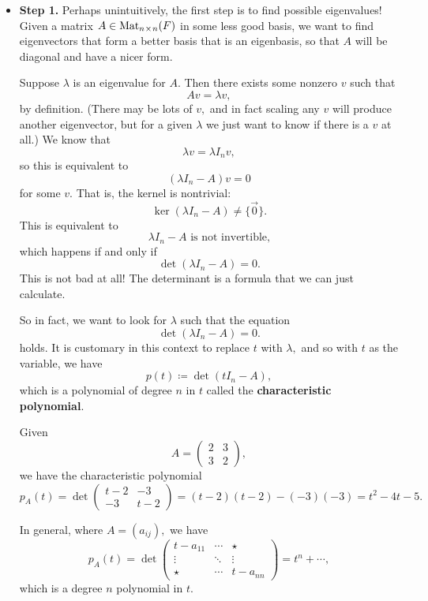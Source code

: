 \begin{itemize}
    \item \textbf{Step 1.} Perhaps unintuitively, the first step is to find possible eigenvalues! Given a matrix $A \in \text{Mat}_{n \hspace{0.05em}{\times}\hspace{0.05em} n}(F)$ in some less good basis, we want to find eigenvectors that form a better basis that is an eigenbasis, so that $A$ will be diagonal and have a nicer form. 
    
    Suppose $\lambda$ is an eigenvalue for $A.$ Then there exists some nonzero $v$ such that \[Av = \lambda v,\] by definition. (There may be lots of $v,$ and in fact scaling any $v$ will produce another eigenvector, but for a given $\lambda$ we just want to know if there is a $v$ at all.) We know that \[\lambda v = \lambda I_n v,\] so this is equivalent to \[(\lambda I_n - A) v = 0\] for some $v.$ That is, the kernel is nontrivial: \[\ker(\lambda I_n -A) \neq \{\vec{0}\}.\] This is equivalent to \[\lambda I_n - A \text{ is not invertible,}\] which happens if and only if \[\det(\lambda I_n - A) = 0.\] This is not bad at all! The determinant is a formula that we can just calculate. 
    
    So in fact, we want to look for $\lambda$ such that the equation\[\boxed{\det(\lambda I_n - A) = 0}.\]  holds. It is customary in this context to replace $t$ with $\lambda,$ and so with $t$ as the variable, we have \[p(t) \coloneqq \det(t I_n - A),\] which is a polynomial of degree $n$ in $t$ called the \textbf{characteristic polynomial}.
    
    \begin{example}
    Given \[A = \begin{pmatrix} 2 & 3 \\ 3 & 2\end{pmatrix},\] we have the characteristic polynomial \[p_A(t) = \det\begin{pmatrix} t - 2 & -3 \\ -3 & t - 2\end{pmatrix} = (t-2)(t-2) - (-3)(-3) = t^2 - 4t - 5.\]
    \end{example}
    
    In general, where $A = (a_{ij}),$ we have \[p_A(t) = \det\begin{pmatrix} t - a_{11} & \cdots & \star \\
    \vdots & \ddots & \vdots \\
    \star & \cdots & t - a_{nn}
    \end{pmatrix} = t^n + \cdots ,\] which is a degree $n$ polynomial in $t.$
    

\end{itemize}
